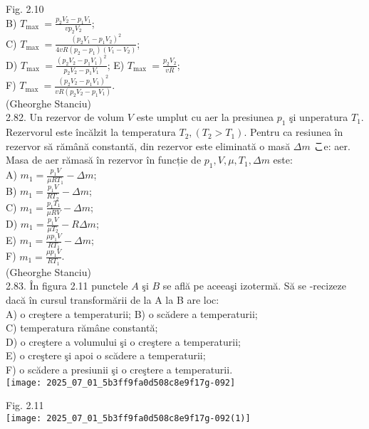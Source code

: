 Fig. 2.10\\
B) $T_{\text {max }}=\frac{p_{2} V_{2}-p_{1} V_{1}}{v p_{2} V_{2}}$;\\
C) $T_{\text {max }}=\frac{\left(p_{2} V_{1}-p_{1} V_{2}\right)^{2}}{4 v R\left(p_{2}-p_{1}\right)\left(V_{1}-V_{2}\right)}$;\\
D) $T_{\text {max }}=\frac{\left(p_{2} V_{2}-p_{1} V_{1}\right)^{2}}{p_{2} V_{2}-p_{1} V_{1}}$; E) $T_{\text {max }}=\frac{p_{2} V_{2}}{v R}$;\\
F) $T_{\text {max }}=\frac{\left(p_{2} V_{2}-p_{1} V_{1}\right)^{2}}{v R\left(p_{2} V_{2}-p_{1} V_{1}\right)}$.\\
(Gheorghe Stanciu)\\
2.82. Un rezervor de volum $V$ este umplut cu aer la presiunea $p_{1}$ şi unperatura $T_{1}$. Rezervorul este încălzit la temperatura $T_{2},\left(T_{2}>T_{1}\right)$. Pentru ca resiunea în rezervor să rămână constantă, din rezervor este eliminată o masă $\Delta m$ こe: aer. Masa de aer rămasă în rezervor în funcție de $p_{1}, V, \mu, T_{1}, \Delta m$ este:\\
A) $m_{1}=\frac{p_{1} V}{\mu R T_{1}}-\Delta m$;\\
B) $m_{1}=\frac{p_{1} V}{R T_{2}}-\Delta m$;\\
C) $m_{1}=\frac{p_{1} T_{1}}{\mu R V}-\Delta m$;\\
D) $m_{1}=\frac{p_{1} V}{\mu T_{2}}-R \Delta m$;\\
E) $m_{1}=\frac{\mu p_{1} V}{R T_{1}}-\Delta m$;\\
F) $m_{1}=\frac{\mu p_{1} V}{R T_{1}}$.\\
(Gheorghe Stanciu)\\
2.83. În figura 2.11 punctele $A$ şi $B$ se află pe aceeaşi izotermă. Să se -recizeze dacă în cursul transformării de la A la B are loc:\\
A) o creştere a temperaturii; B) o scădere a temperaturii;\\
C) temperatura rămâne constantă;\\
D) o creştere a volumului şi o creştere a temperaturii;\\
E) o creştere şi apoi o scădere a temperaturii;\\
F) o scădere a presiunii şi o creştere a temperaturii.\\
\texttt{[image: 2025\_07\_01\_5b3ff9fa0d508c8e9f17g-092]}

Fig. 2.11\\
\texttt{[image: 2025\_07\_01\_5b3ff9fa0d508c8e9f17g-092(1)]}

